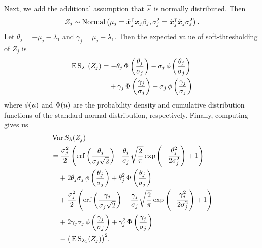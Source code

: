Next, we add the additional assumption that \(\vec{\varepsilon}\) is normally distributed.
Then
\[
  {Z_j} \sim \operatorname{Normal}\left(\mu_j = \tilde{\boldsymbol{x}}_j^\intercal\boldsymbol{x}_j \beta_j, \sigma_j^2 = \tilde{\boldsymbol{x}}_j^\intercal\tilde{\boldsymbol{x}}_j \sigma_\varepsilon^2 \right).
\]
Let \(\theta_j = -\mu_j -\lambda_1 \) and \(\gamma_j = \mu_j - \lambda_1\). Then the
expected value of soft-thresholding of \({Z_j}\) is
\begin{align}
  \E \st_{\lambda_1}({Z_j})
   & = -\theta_j \cdf\left(\frac{\theta_j}{\sigma_j}\right) - \sigma_j \pdf\left(\frac{\theta_j}{\sigma_j}\right)                                          \nonumber \\
   & \phantom{={}}+ \gamma_j \cdf\left(\frac{\gamma_j}{\sigma_j}\right) + \sigma_j \pdf\left(\frac{\gamma_j}{\sigma_j}\right) \label{eq:mean-centered-eval}
\end{align}
where \(\operatorname{\phi}(u)\) and \(\operatorname{\Phi}(u)\) are the probability density and cumulative distribution
functions of the standard normal distribution, respectively. Finally, computing  gives us
\begin{align}
  \label{eq:mean-centered-variance}
   & \var{S_\lambda(Z_j)}                                                                                                                                                                                       \nonumber  \\
   & = \frac{\sigma_j^2}{2} \left( \erf\left(\frac{\theta_j}{\sigma_j\sqrt{2}}\right) \phantom{-{}} \frac{\theta_j}{\sigma_j}\sqrt{\frac{2}{\pi}} \exp\left(-\frac{\theta_j^2}{2\sigma_j^2}\right) + 1 \right)  \nonumber  \\
   & \phantom{={}} + 2 \theta_j \sigma_j \pdf \left(\frac{\theta_j}{\sigma_j}\right) + \theta_j^2 \cdf\left(\frac{\theta_j}{\sigma_j}\right) \nonumber                                                                     \\
   & \phantom{={}} + \frac{\sigma_j^2}{2} \left( \erf\left(\frac{\gamma_j}{\sigma_j\sqrt{2}}\right) - \frac{\gamma_j}{\sigma_j}\sqrt{\frac{2}{\pi}} \exp\left(-\frac{\gamma_j^2}{2\sigma_j^2}\right) + 1 \right) \nonumber \\
   & \phantom{={}} + 2 \gamma_j \sigma_j \pdf \left(\frac{\gamma_j}{\sigma_j}\right) + \gamma_j^2 \cdf\left(\frac{\gamma_j}{\sigma_j}\right) \nonumber                                                                     \\
   & \phantom{={}} - \big(\E \st_{\lambda_1}({Z_j})\big)^2.
\end{align}

